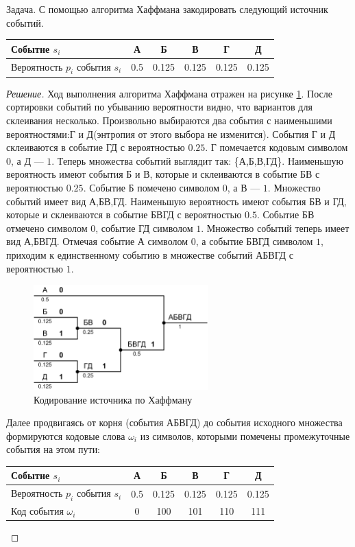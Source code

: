 \begin{exampl} Задача. С помощью алгоритма Хаффмана закодировать следующий источник событий.

    \begin{tabular}{|l||c|c|c|c|c|}
        \hline
        Событие $s_i$                   &А      &Б      &В      &Г      &Д      \\ \hline
        Вероятность $p_i$ события $s_i$ &0.5    &0.125  &0.125  &0.125  &0.125  \\ \hline
    \end{tabular}
\end{exampl}
\begin{proof}[Решение]
    Ход выполнения алгоритма Хаффмана отражен на рисунке \ref{fig:code:haffman2Ex}. После сортировки событий по убыванию вероятности видно, что вариантов для склеивания несколько. Произвольно выбираются два события с наименьшими вероятностями:Г и Д(энтропия от этого выбора не изменится). События Г и Д склеиваются в событие ГД с вероятностью $0.25$. Г помечается кодовым символом $0$, а Д --- $1$. Теперь множества событий выглядит так: \{А,Б,В,ГД\}. Наименьшую вероятность имеют события Б и В, которые и склеиваются в событие БВ с вероятностью $0.25$. Событие Б помечено символом $0$, а В --- $1$. Множество событий имеет вид {А,БВ,ГД}. Наименьшую вероятность имеют события БВ и ГД, которые и склеиваются в событие БВГД с вероятностью $0.5$. Событие БВ отмечено символом $0$, событие ГД символом $1$. Множество событий теперь имеет вид {А,БВГД}. Отмечая событие А символом $0$, а событие БВГД символом $1$, приходим к единственному событию в множестве событий {АБВГД} с вероятностью $1$.
    \begin{figure}
        \centering
        \includegraphics[width=0.6\textwidth]{fig/haffman2Ex}
        \caption{Кодирование источника по Хаффману}
        \label{fig:code:haffman2Ex}
    \end{figure} 
    Далее продвигаясь от корня (события АБВГД) до события исходного множества формируются кодовые слова $\omega_i$ из символов, которыми помечены промежуточные события на этом пути:
    \begin{tabular}{|l||c|c|c|c|c|}
        \hline
        Событие $s_i$                   &А      &Б      &В      &Г      &Д      \\ \hline
        Вероятность $p_i$ события $s_i$ &0.5    &0.125  &0.125  &0.125  &0.125  \\ \hline
        Код события $\omega_i$          &0      &100    &101    &110    &111    \\ \hline
    \end{tabular}
    

\end{proof}
